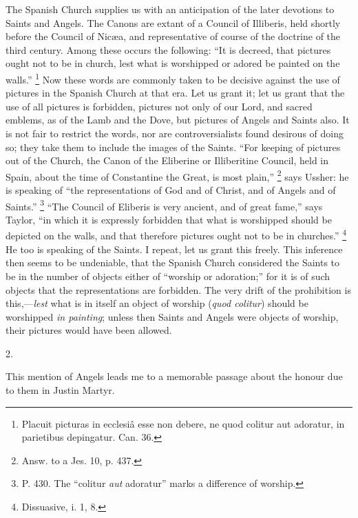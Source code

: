 The Spanish Church supplies us with an anticipation of the later
devotions to Saints and Angels. The Canons are extant of a Council of
Illiberis, held shortly before the Council of Nicæa, and
representative of course of the doctrine of the third century. Among
these occurs the following: ``It is decreed, that pictures ought
not to be in church, lest what is worshipped or adored be painted on
the walls.'' \footnote{Placuit picturas in ecclesiâ esse non
debere, ne quod colitur aut adoratur, in parietibus depingatur. Can.
36.} Now
these words are commonly taken to be decisive against the use of
pictures in the Spanish Church at that era. Let us grant it; let us
grant that the use of all pictures is forbidden, pictures not only of
our Lord, and sacred emblems, as of the Lamb and the Dove, but
pictures of Angels and Saints also. It is not fair to restrict the
words, nor are controversialists found desirous of doing so; they take
them to include the images of the Saints. ``For keeping of
pictures out of the Church, the Canon of the Eliberine or Illiberitine
Council, held in Spain, about the time of Constantine the Great, is
most plain,'' \footnote{Answ. to a Jes. 10, p. 437.}
says Ussher: he is speaking of ``the representations of God and of
Christ, and of Angels and of Saints.'' \footnote{P. 430. The ``colitur \emph{aut}
adoratur'' marks a difference of worship.} ``The Council of Eliberis is very ancient, and of great
fame,'' says Taylor, ``in which it is expressly forbidden that
what is worshipped should be depicted on the walls, and that therefore
pictures ought not to be in churches.'' \footnote{Dissuasive, i. 1, 8.} He too is speaking of the Saints. I repeat, let us grant this
freely. This inference then seems to be undeniable, that the Spanish
Church considered the Saints to be in the number of objects either of
``worship or adoration;'' for it is of such objects that the
representations are forbidden. The very drift of the prohibition is
this,—\emph{lest} what is in itself an object of worship (\emph{quod
colitur}) should be worshipped \emph{in painting}; unless then
Saints and Angels were objects of worship, their pictures would have
been allowed.

2.

This mention of Angels leads me to a memorable passage about the
honour due to them in Justin Martyr.

